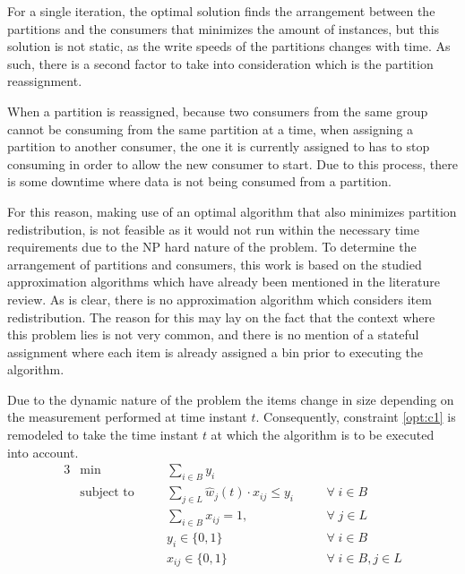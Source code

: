 For a single iteration, the optimal solution finds the arrangement between the
partitions and the consumers that minimizes the amount of instances, but this
solution is not static, as the write speeds of the partitions changes with time.
As such, there is a second factor to take into consideration which is the
partition reassignment. 

When a partition is reassigned, because two consumers from the same group cannot
be consuming from the same partition at a time, when assigning a partition to
another consumer, the one it is currently assigned to has to stop consuming in
order to allow the new consumer to start. Due to this process, there is some
downtime where data is not being consumed from a partition.

For this reason, making use of an optimal algorithm that also minimizes
partition redistribution, is not feasible as it would not run within the
necessary time requirements due to the NP hard nature of the problem.  To
determine the arrangement of partitions and consumers, this work is based on the
studied approximation algorithms which have already been mentioned in the
literature review. As is clear, there is no approximation algorithm which
considers item redistribution. The reason for this may lay on the fact that the
context where this problem lies is not very common, and there is no mention of a
stateful assignment where each item is already assigned a bin prior to executing
the algorithm.

Due to the dynamic nature of the problem the items change in size depending on
the measurement performed at time instant $t$. Consequently, constraint
\ref{opt:c1} is remodeled to take the time instant $t$ at which the algorithm is
to be executed into account.
\begin{alignat}{3}
\label{BPP model}
    &\min       
        &&\sum_{i \in B} y_i 
            && \\
    &\text{subject to} \quad
        && \sum_{j \in L} \hat w_j(t) \cdot x_{ij} \leq y_i \quad      
            && \forall \; i \in B \\
    &   && \sum_{i \in B} x_{ij} = 1, \quad                             
            && \forall \; j \in L \\
    &   && y_i \in \{0, 1\}                                             
            && \forall \; i \in B \\
    &   && x_{ij} \in \{0,1\}                                           
            && \forall \; i \in B, j \in L
\end{alignat}

